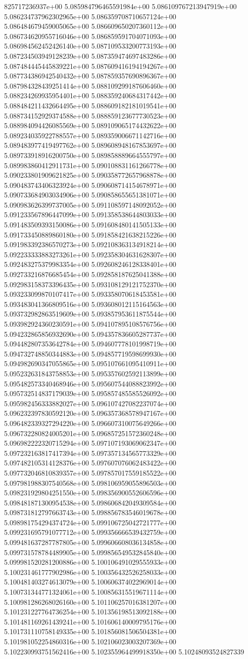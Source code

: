 825717236937e+00	5.085984796465591984e+00	5.086109767213947919e+00	5.086234737962302965e+00	5.086359708710657124e+00	5.086484679459005065e+00	5.086609650207360112e+00	5.086734620955716046e+00	5.086859591704071093e+00	5.086984562452426140e+00	5.087109533200773193e+00	5.087234503949128239e+00	5.087359474697483286e+00	5.087484445445839221e+00	5.087609416194194267e+00	5.087734386942540432e+00	5.087859357690896367e+00	5.087984328439251414e+00	5.088109299187606460e+00	5.088234269935954401e+00	5.088359240684317442e+00	5.088484211432664495e+00	5.088609182181019541e+00	5.088734152929374588e+00	5.088859123677730523e+00	5.088984094426085569e+00	5.089109065174432622e+00	5.089234035922788557e+00	5.089359006671142716e+00	5.089483977419497762e+00	5.089608948167853697e+00	5.089733918916200750e+00	5.089858889664555797e+00	5.089983860412911731e+00	5.090108831161266778e+00	5.090233801909621825e+00	5.090358772657968878e+00	5.090483743406323924e+00	5.090608714154678971e+00	5.090733684903034906e+00	5.090858655651381071e+00	5.090983626399737005e+00	5.091108597148092052e+00	5.091233567896447099e+00	5.091358538644803033e+00	5.091483509393150086e+00	5.091608480141505133e+00	5.091733450889860180e+00	5.091858421638215226e+00	5.091983392386570273e+00	5.092108363134918214e+00	5.092233333883273261e+00	5.092358304631628307e+00	5.092483275379983354e+00	5.092608246128338401e+00	5.092733216876685454e+00	5.092858187625041388e+00	5.092983158373396435e+00	5.093108129121752370e+00	5.093233099870107417e+00	5.093358070618453581e+00	5.093483041366809516e+00	5.093608012115164563e+00	5.093732982863519609e+00	5.093857953611875544e+00	5.093982924360230591e+00	5.094107895108576756e+00	5.094232865856932690e+00	5.094357836605287737e+00	5.094482807353642784e+00	5.094607778101998719e+00	5.094732748850344883e+00	5.094857719598699930e+00	5.094982690347055865e+00	5.095107661095410911e+00	5.095232631843758853e+00	5.095357602592113899e+00	5.095482573340468946e+00	5.095607544088823992e+00	5.095732514837179039e+00	5.095857485585526092e+00	5.095982456333882027e+00	5.096107427082237074e+00	5.096232397830592120e+00	5.096357368578947167e+00	5.096482339327294220e+00	5.096607310075649266e+00	5.096732280824005201e+00	5.096857251572360248e+00	5.096982222320715294e+00	5.097107193069062347e+00	5.097232163817417394e+00	5.097357134565773329e+00	5.097482105314128376e+00	5.097607076062483422e+00	5.097732046810839357e+00	5.097857017559185522e+00	5.097981988307540568e+00	5.098106959055896503e+00	5.098231929804251550e+00	5.098356900552606596e+00	5.098481871300954538e+00	5.098606842049309584e+00	5.098731812797663743e+00	5.098856783546019678e+00	5.098981754294374724e+00	5.099106725042721777e+00	5.099231695791077712e+00	5.099356666539432759e+00	5.099481637287787805e+00	5.099606608036134858e+00	5.099731578784489905e+00	5.099856549532845840e+00	5.099981520281200886e+00	5.100106491029555933e+00	5.100231461777902986e+00	5.100356432526258033e+00	5.100481403274613079e+00	5.100606374022969014e+00	5.100731344771324061e+00	5.100856315519671114e+00	5.100981286268026160e+00	5.101106257016381207e+00	5.101231227764736254e+00	5.101356198513092188e+00	5.101481169261439241e+00	5.101606140009795176e+00	5.101731110758149335e+00	5.101856081506504381e+00	5.101981052254860316e+00	5.102106023003207369e+00	5.102230993751562416e+00	5.102355964499918350e+00	5.10248093524827339